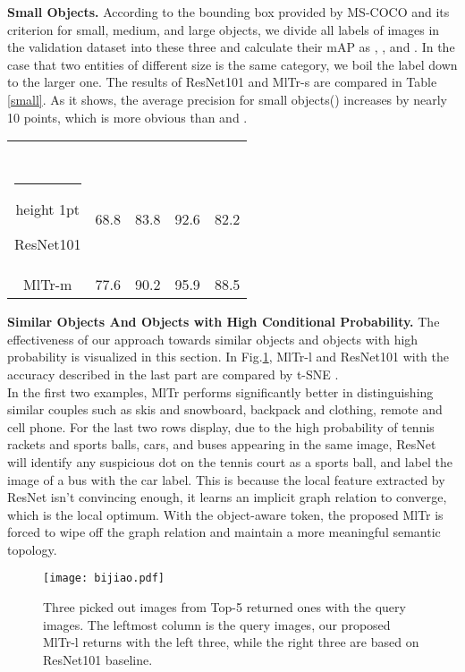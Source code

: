 \documentclass{article} \usepackage[numbers,sort&compress]{natbib}
\makeatletter
\newcommand{\thickhline}{\noalign {\ifnum 0=`}\fi \hrule height 1pt
    \futurelet \reserved@a \@xhline
}
\makeatother
\begin{document}
\textbf{Small Objects.}
According to the bounding box provided by MS-COCO and its criterion for small, medium, and large objects, we divide all labels of images in the validation dataset into these three and calculate their mAP as , , and . In the case that two entities of different size is the same category, we boil the label down to the larger one. The results of ResNet101 and MlTr-s are compared in Table \ref{small}. As it shows, the average precision for small objects() increases by nearly 10 points, which is more obvious than  and .

\begin{table*}[h]
\centering
\caption{The comparisons in three different size objects.}
\label{small}
\begin{tabular}{|c|c|c|c|c|}
\hline
\  &  &  &  &  \\
\thickhline
ResNet101 \cite{he2016deep} &68.8 &83.8 &92.6 &82.2 \\
\hline
MlTr-m &77.6 &90.2 &95.9  &88.5\\
\hline
\end{tabular}
\end{table*}

\textbf{Similar Objects And Objects with High Conditional Probability.}
The effectiveness of our approach towards similar objects and objects with high probability is visualized in this section. In Fig.\ref{bijiao}, MlTr-l and ResNet101 with the accuracy described in the last part are compared by t-SNE \cite{van2008visualizing}.\\
In the first two examples, MlTr performs significantly better in distinguishing similar couples such as skis and snowboard, backpack and clothing, remote and cell phone. For the last two rows display, due to the high probability of tennis rackets and sports balls, cars, and buses appearing in the same image, ResNet will identify any suspicious dot on the tennis court as a sports ball, and label the image 
of a bus with the car label. This is because the local feature extracted by ResNet isn't convincing enough, it learns an implicit graph relation to converge, which is the local optimum. With the object-aware token, the proposed MlTr is forced to wipe off the graph relation and maintain a more meaningful semantic topology.



\begin{figure}[h]
\begin{center}
\texttt{[image: bijiao.pdf]}
\caption{Three picked out images from Top-5 returned ones with the query images. The leftmost column is the query images, our proposed MlTr-l returns with the left three, while the right three are based on ResNet101 baseline.}
\label{bijiao}
\end{center}
\end{figure}
\end{document}
